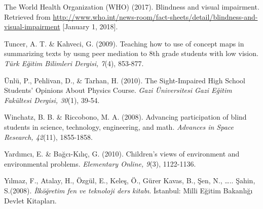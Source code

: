\documentclass[11.5pt]{sig-alternate} %
\begin{document}
The World Health Organization (WHO) (2017). Blindness and visual impairment. Retrieved from  \url{http://www.who.int/news-room/fact-sheets/detail/blindness-and-visual-impairment} [January 1, 2018]. 

Tuncer, A. T. \& Kahveci, G. (2009). Teaching how to use of concept maps in summarizing texts by usıng peer mediation to 8th grade students with low vision. \textit{Türk Eğitim Bilimleri Dergisi, 7}(4), 853-877.

Ünlü, P., Pehlivan, D., \& Tarhan, H. (2010). The Sight-Impaired High School Students' Opinions About Physics Course. \textit{Gazi Üniversitesi Gazi Eğitim Fakültesi Dergisi, 30}(1), 39-54.

Winchatz, B. B. \& Riccobono, M. A. (2008). Advancing participation of blind students in science, technology, engineering, and math. \textit{Advances in Space Research, 42}(11), 1855-1858.

Yardımcı, E. \& Bağcı-Kılıç, G. (2010). Children’s views of environment and environmental problems. \textit{Elementary Online, 9}(3), 1122-1136.

Yılmaz, F., Atalay, H., Özgül, E., Keleş, Ö., Gürer Kavas, B., Şen, N., ….. Şahin, S.(2008). \textit{İlköğretim fen ve teknoloji ders kitabı}. İstanbul: Milli Eğitim Bakanlığı Devlet Kitapları.
\end{document}
